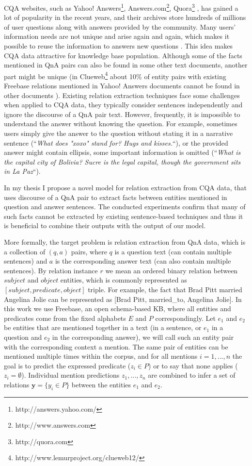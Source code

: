 CQA websites, such as Yahoo! Answers\footnote{http://answers.yahoo.com/}, Answers.com\footnote{http://www.answers.com}, Quora\footnote{http://quora.com} \etc, has gained a lot of popularity in the recent years, and their archives store hundreds of millions of user questions along with answers provided by the community.
Many users' information needs are not unique and arise again and again, which makes it possible to reuse the information to answers new questions \cite{Shtok:2012:LPA:2187836.2187939}.
This idea makes CQA data attractive for knowledge base population.
Although some of the facts mentioned in QnA pairs can also be found in some other text documents, another part might be unique (\eg in Clueweb\footnote{http://www.lemurproject.org/clueweb12/} about 10\% of entity pairs with existing Freebase relations mentioned in Yahoo! Answers documents cannot be found in other documents \cite{savenkov2015relation}).
Existing relation extraction techniques face some challenges when applied to CQA data, \ie they typically consider sentences independently and ignore the discourse of a QnA pair text.
However, frequently, it is impossible to understand the answer without knowing the question.
For example, sometimes users simply give the answer to the question without stating it in a narrative sentence (\eg ``\emph{What does "xoxo" stand for? Hugs and kisses.}``), or the provided answer might contain ellipsis, \ie some important information is omitted (\eg ``\emph{What is the capital city of Bolivia? Sucre is the legal capital, though the government sits in La Paz}``).

In my thesis I propose a novel model for relation extraction from CQA data, that uses discourse of a QnA pair to extract facts between entities mentioned in question and answer sentences.
The conducted experiments confirm that many of such facts cannot be extracted by existing sentence-based techniques and thus it is beneficial to combine their outputs with the output of our model.

More formally, the target problem is relation extraction from QnA data, which is a collection of $(q, a)$ pairs, where $q$ is a question text (can contain multiple sentences) and $a$ is the corresponding answer text (can also contain multiple sentences).
By relation instance $r$ we mean an ordered binary relation between $subject$ and $object$ entities, which is commonly represented as $[subject, predicate, object]$ triple.
For example, the fact that Brad Pitt married Angelina Jolie can be represented as [Brad Pitt, married\_to, Angelina Jolie].
In this work we use Freebase, an open schema-based KB, where all entities and predicates come from the fixed alphabets $E$ and $P$ correspondingly.
Let $e_1$ and $e_2$ be entities that are mentioned together in a text (\eg in a sentence, or $e_1$ in a question and $e_2$ in the corresponding answer), we will call such an entity pair with the corresponding context a mention.
The same pair of entities can be mentioned multiple times within the corpus, and for all mentions $i=1,...,n$ the goal is to predict the expressed predicate ($z_i \in P$) or to say that none applies ($z_i = \emptyset$).
Individual mention predictions $z_1, ..., z_n$ are combined to infer a set of relations $\mathbf{y}=\{y_i \in P\}$ between the entities $e_1$ and $e_2$.

